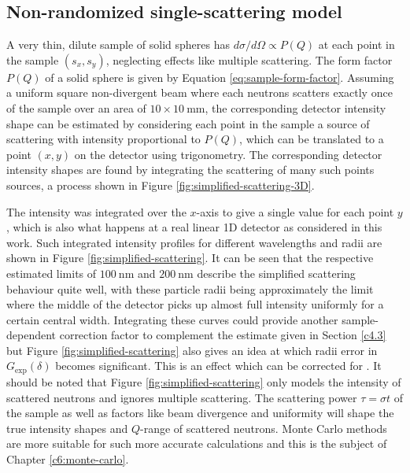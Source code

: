 \subsection{Non-randomized single-scattering model}
A very thin, dilute sample of solid spheres has $d\sigma/d\Omega \propto P(Q)$ at each point in the sample $(s_x, s_y)$, neglecting effects like multiple scattering. The form factor $P(Q)$ of a solid sphere is given by Equation \eqref{eq:sample-form-factor}. Assuming a uniform square non-divergent beam where each neutrons scatters exactly once of the sample over an area of $10\times10~\unit{\milli\meter}$, the corresponding detector intensity shape can be estimated by considering each point in the sample a source of scattering with intensity proportional to $P(Q)$, which can be translated to a point $(x,y)$ on the detector using trigonometry. The corresponding detector intensity shapes are found by integrating the scattering of many such points sources, a process shown in Figure \ref{fig:simplified-scattering-3D}. 


The intensity was integrated over the $x$-axis to give a single value for each point $y$, which is also what happens at a real linear 1D detector as considered in this work. Such integrated intensity profiles for different wavelengths and radii are shown in Figure \ref{fig:simplified-scattering}. It can be seen that the respective estimated limits of $\SI{100}{\nano\meter}$ and $\SI{200}{\nano\meter}$ describe the simplified scattering behaviour quite well, with these particle radii being approximately the limit where the middle of the detector picks up almost full intensity uniformly for a certain central width. Integrating these curves could provide another sample-dependent correction factor to complement the estimate given in Section \ref{c4.3} but Figure \ref{fig:simplified-scattering} also gives an idea at which radii error in $G_\text{exp}(\delta)$ becomes significant. This is an effect which can be corrected for \cite{kusmin2017}. It should be noted that Figure \ref{fig:simplified-scattering} only models the intensity of scattered neutrons and ignores multiple scattering. The scattering power $\tau = \sigma t$ of the sample as well as factors like beam divergence and uniformity will shape the true intensity shapes and $Q$-range of scattered neutrons.  Monte Carlo methods are more suitable for such more accurate calculations and this is the subject of Chapter \ref{c6:monte-carlo}.



